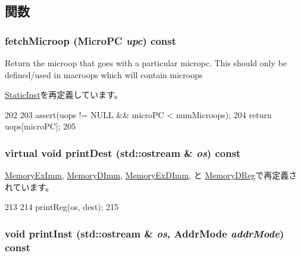 \subsection{関数}
\hypertarget{classArmISA_1_1Memory_ae9e7acd6304ee397f1ab470e283ae76b}{
\subsubsection[{fetchMicroop}]{ fetchMicroop ({\bf MicroPC} {\em upc}) const}}
\label{classArmISA_1_1Memory_ae9e7acd6304ee397f1ab470e283ae76b}
Return the microop that goes with a particular micropc. This should only be defined/used in macroops which will contain microops 

\hyperlink{classStaticInst_aa5c7e6f7323850b84dbf5b8e47856173}{StaticInst}を再定義しています。


\begin{DoxyCode}
202     {
203         assert(uops != NULL && microPC < numMicroops);
204         return uops[microPC];
205     }
\end{DoxyCode}
\hypertarget{classArmISA_1_1Memory_a9a9365f7ef96d4838529320970308a57}{
\subsubsection[{printDest}]{\setlength{\rightskip}{0pt plus 5cm}virtual void printDest (std::ostream \& {\em os}) const}}
\label{classArmISA_1_1Memory_a9a9365f7ef96d4838529320970308a57}


\hyperlink{classArmISA_1_1MemoryExImm_adee5df6e5d6b0c498363aabda42431fa}{MemoryExImm}, \hyperlink{classArmISA_1_1MemoryDImm_adee5df6e5d6b0c498363aabda42431fa}{MemoryDImm}, \hyperlink{classArmISA_1_1MemoryExDImm_adee5df6e5d6b0c498363aabda42431fa}{MemoryExDImm}, と \hyperlink{classArmISA_1_1MemoryDReg_adee5df6e5d6b0c498363aabda42431fa}{MemoryDReg}で再定義されています。


\begin{DoxyCode}
213     {
214         printReg(os, dest);
215     }
\end{DoxyCode}
\hypertarget{classArmISA_1_1Memory_aa54b7cb19956c78633c70dfaf60bcf7d}{
\subsubsection[{printInst}]{\setlength{\rightskip}{0pt plus 5cm}void printInst (std::ostream \& {\em os}, \/  {\bf AddrMode} {\em addrMode}) const}}
\label{classArmISA_1_1Memory_aa54b7cb19956c78633c70dfaf60bcf7d}



